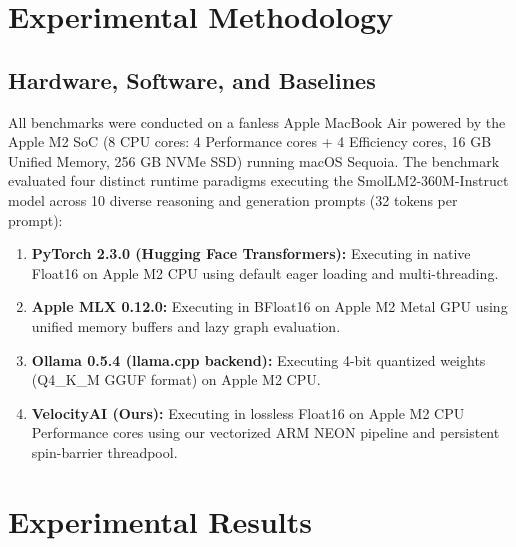\documentclass[a4paper,twocolumn,10pt]{article}
\begin{document}
\section{Experimental Methodology}

\subsection{Hardware, Software, and Baselines}
All benchmarks were conducted on a fanless Apple MacBook Air powered by the Apple M2 SoC (8 CPU cores: 4 Performance cores + 4 Efficiency cores, 16 GB Unified Memory, 256 GB NVMe SSD) running macOS Sequoia. The benchmark evaluated four distinct runtime paradigms executing the SmolLM2-360M-Instruct model across 10 diverse reasoning and generation prompts (32 tokens per prompt):
\begin{enumerate}
    \item \textbf{PyTorch 2.3.0 (Hugging Face Transformers):} Executing in native Float16 on Apple M2 CPU using default eager loading and multi-threading.
    \item \textbf{Apple MLX 0.12.0:} Executing in BFloat16 on Apple M2 Metal GPU using unified memory buffers and lazy graph evaluation.
    \item \textbf{Ollama 0.5.4 (llama.cpp backend):} Executing 4-bit quantized weights (Q4\_K\_M GGUF format) on Apple M2 CPU.
    \item \textbf{VelocityAI (Ours):} Executing in lossless Float16 on Apple M2 CPU Performance cores using our vectorized ARM NEON pipeline and persistent spin-barrier threadpool.
\end{enumerate}

\section{Experimental Results}
\end{document}
